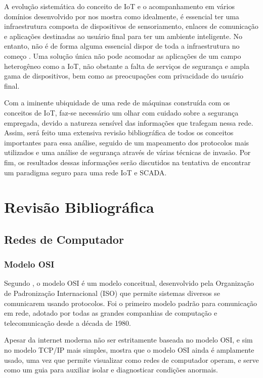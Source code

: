 \documentclass[tcc,capa]{texufpel}
\begin{document}
A evolução sistemática do conceito de IoT e o acompanhamento em vários domínios desenvolvido por \citet{Ibarra-Esquer} nos mostra como idealmente, é essencial ter uma infraestrutura composta de dispositivos de sensoriamento, enlaces de comunicação e aplicações destinadas ao usuário final para ter um ambiente inteligente. No entanto, não é de forma alguma essencial dispor de toda a infraestrutura no começo \cite{laya}. Uma solução única não pode acomodar as aplicações de um campo heterogêneo como a IoT, não obstante a falta de serviços de segurança e ampla gama de dispositivos, bem como as preocupações com privacidade do usuário final. 

Com a iminente ubiquidade de uma rede de máquinas construída com os conceitos de IoT, faz-se necessário um olhar com cuidado sobre a segurança empregada, devido a natureza sensível
das informações que trafegam nessa rede. Assim, será feito uma extensiva revisão bibliográfica de todos os conceitos importantes para essa análise, seguido de um mapeamento dos
protocolos mais utilizados e uma análise de segurança através de várias técnicas de invasão. Por fim, os resultados dessas informações serão discutidos na tentativa de encontrar um
paradigma seguro para uma rede IoT e SCADA. 

\chapter{Revisão Bibliográfica}

\section{Redes de Computador}
\subsection{Modelo OSI}

Segundo \citet{kurose}, o modelo OSI é um modelo conceitual, desenvolvido pela Organização de Padronização Internacional (ISO) que permite sistemas diversos se comunicarem usando protocolos. Foi o primeiro modelo padrão para comunicação em rede, adotado por todas as grandes companhias de computação e telecomunicação desde a década de 1980.

Apesar da internet moderna não ser estritamente baseada no modelo OSI, e sim no modelo TCP/IP mais simples, \citet{kurose} mostra que o modelo OSI ainda é amplamente usado, uma vez que permite visualizar como redes de computador operam, e serve como um guia para auxiliar isolar e 
diagnosticar condições anormais.
\end{document}
